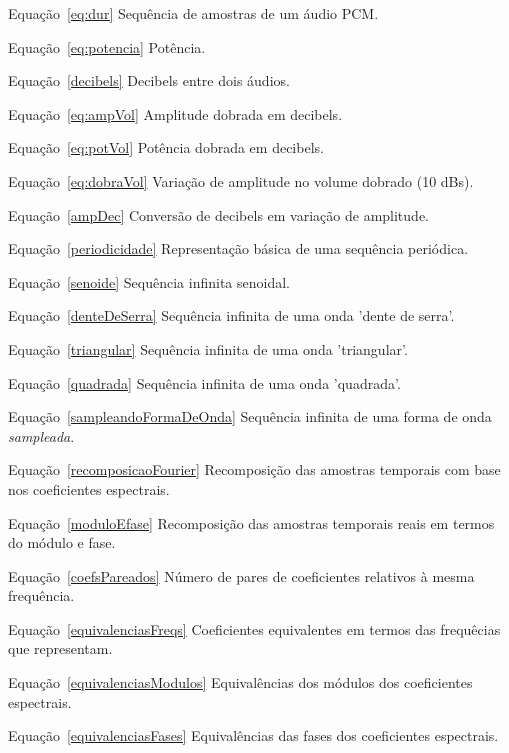 	\begin{listaespecial}[BIGNAMEWIDTH]
        \item[Equação~\ref{eq:dur}] Sequência de amostras de um áudio PCM.
        \item[Equação~\ref{eq:potencia}] Potência.
        \item[Equação~\ref{decibels}] Decibels entre dois áudios.
        \item[Equação~\ref{eq:ampVol}]  Amplitude dobrada em decibels.
        \item[Equação~\ref{eq:potVol}] Potência dobrada em decibels.
        \item[Equação~\ref{eq:dobraVol}] Variação de amplitude no volume dobrado (10 dBs).
        \item[Equação~\ref{ampDec}] Conversão de decibels em variação de amplitude.
        \item[Equação~\ref{periodicidade}] Representação básica de uma sequência periódica.
        \item[Equação~\ref{senoide}] Sequência infinita senoidal.
        \item[Equação~\ref{denteDeSerra}] Sequência infinita de uma onda 'dente de serra'.
        \item[Equação~\ref{triangular}] Sequência infinita de uma onda 'triangular'.
        \item[Equação~\ref{quadrada}] Sequência infinita de uma onda 'quadrada'.
        \item[Equação~\ref{sampleandoFormaDeOnda}] Sequência infinita de uma forma de onda \emph{sampleada}.
        \item[Equação~\ref{recomposicaoFourier}] Recomposição das amostras temporais com base nos coeficientes espectrais.
        \item[Equação~\ref{moduloEfase}] Recomposição das amostras temporais reais em termos do módulo e fase.
        \item[Equação~\ref{coefsPareados}] Número de pares de coeficientes relativos à mesma frequência.
        \item[Equação~\ref{equivalenciasFreqs}] Coeficientes equivalentes em termos das frequêcias que representam.
        \item[Equação~\ref{equivalenciasModulos}] Equivalências dos módulos dos coeficientes espectrais.
        \item[Equação~\ref{equivalenciasFases}] Equivalências das fases dos coeficientes espectrais.

\end{listaespecial}
